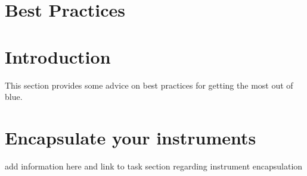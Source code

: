 \section{Best Practices}\label{bestPractices}

\section{Introduction}

This section provides some advice on best practices for getting the most
out of blue.

\section{Encapsulate your instruments}

add information here and link to task section regarding instrument
encapsulation
